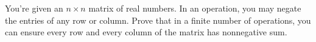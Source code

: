 \begin{problem}
    You're given an $n \times n$ matrix of real numbers.
    In an operation, you may negate the entries of any row or column.
    Prove that in a finite number of operations,
    you can ensure every row and every column of the matrix has nonnegative sum.

    \label{ZD0C7797}
\end{problem}